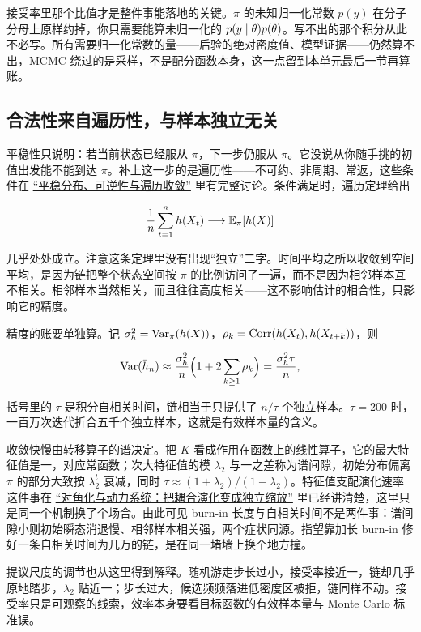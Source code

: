 接受率里那个比值才是整件事能落地的关键。\(\pi\) 的未知归一化常数 \(p(y)\) 在分子分母上原样约掉，你只需要能算未归一化的 \(p(y\mid\theta)p(\theta)\)。写不出的那个积分从此不必写。所有需要归一化常数的量——后验的绝对密度值、模型证据——仍然算不出，MCMC 绕过的是采样，不是配分函数本身，这一点留到本单元最后一节再算账。

\subsection{合法性来自遍历性，与样本独立无关}

平稳性只说明：若当前状态已经服从 \(\pi\)，下一步仍服从 \(\pi\)。它没说从你随手挑的初值出发能不能到达 \(\pi\)。补上这一步的是遍历性——不可约、非周期、常返，这些条件在 \hyperref[sec:06-Random-Processes/03-Markov-Chains/04]{``平稳分布、可逆性与遍历收敛''} 里有完整讨论。条件满足时，遍历定理给出

\[
\frac1n\sum_{t=1}^nh(X_t)\longrightarrow\mathbb{E}_\pi[h(X)]
\]

几乎处处成立。注意这条定理里没有出现``独立''二字。时间平均之所以收敛到空间平均，是因为链把整个状态空间按 \(\pi\) 的比例访问了一遍，而不是因为相邻样本互不相关。相邻样本当然相关，而且往往高度相关——这不影响估计的相合性，只影响它的精度。

精度的账要单独算。记 \(\sigma_h^2=\operatorname{Var}_\pi(h(X))\)，\(\rho_k=\operatorname{Corr}(h(X_t),h(X_{t+k}))\)，则

\[
\operatorname{Var}(\bar h_n)
\approx\frac{\sigma_h^2}{n}\Bigl(1+2\sum_{k\ge1}\rho_k\Bigr)
=\frac{\sigma_h^2\tau}{n},
\]

括号里的 \(\tau\) 是积分自相关时间，链相当于只提供了 \(n/\tau\) 个独立样本。\(\tau=200\) 时，一百万次迭代折合五千个独立样本，这就是有效样本量的含义。

收敛快慢由转移算子的谱决定。把 \(K\) 看成作用在函数上的线性算子，它的最大特征值是一，对应常函数；次大特征值的模 \(\lambda_2\) 与一之差称为谱间隙，初始分布偏离 \(\pi\) 的部分大致按 \(\lambda_2^t\) 衰减，同时 \(\tau\approx(1+\lambda_2)/(1-\lambda_2)\)。特征值支配演化速率这件事在 \hyperref[sec:03-Linear-Algebra/05-Eigenvalues-and-Eigenvectors/02]{``对角化与动力系统：把耦合演化变成独立缩放''} 里已经讲清楚，这里只是同一个机制换了个场合。由此可见 burn-in 长度与自相关时间不是两件事：谱间隙小则初始瞬态消退慢、相邻样本相关强，两个症状同源。指望靠加长 burn-in 修好一条自相关时间为几万的链，是在同一堵墙上换个地方撞。

提议尺度的调节也从这里得到解释。随机游走步长过小，接受率接近一，链却几乎原地踏步，\(\lambda_2\) 贴近一；步长过大，候选频频落进低密度区被拒，链同样不动。接受率只是可观察的线索，效率本身要看目标函数的有效样本量与 Monte Carlo 标准误。

